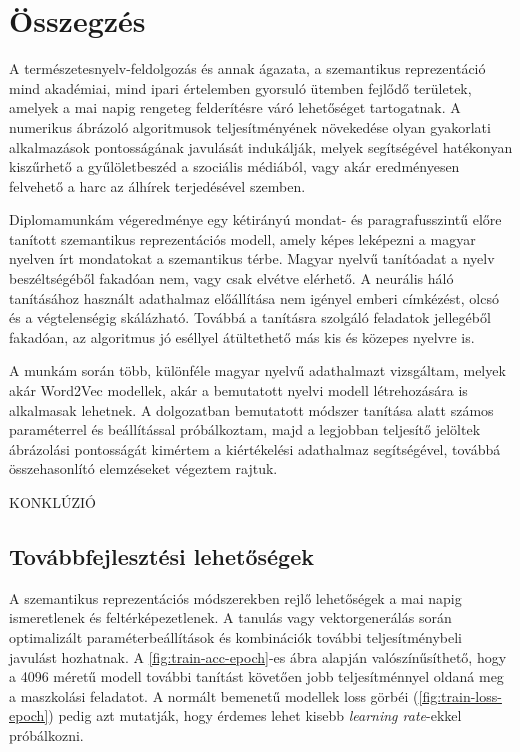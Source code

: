 \chapter{Összegzés} %
\label{ch:sum}

A természetesnyelv-feldolgozás és annak ágazata, a szemantikus reprezentáció mind akadémiai, mind ipari értelemben gyorsuló ütemben fejlődő területek, amelyek a mai napig rengeteg felderítésre váró lehetőséget tartogatnak. A numerikus ábrázoló algoritmusok teljesítményének növekedése olyan gyakorlati alkalmazások pontosságának javulását indukálják, melyek segítségével hatékonyan kiszűrhető a gyűlöletbeszéd a szociális médiából, vagy akár eredményesen felvehető a harc az álhírek terjedésével szemben. 

Diplomamunkám végeredménye egy kétirányú mondat- és paragrafusszintű előre tanított szemantikus reprezentációs modell, amely képes leképezni a magyar nyelven írt mondatokat a szemantikus térbe. Magyar nyelvű tanítóadat a nyelv beszéltségéből fakadóan nem, vagy csak elvétve elérhető. A neurális háló tanításához használt adathalmaz előállítása nem igényel emberi címkézést, olcsó és a végtelenségig skálázható. Továbbá a tanításra szolgáló feladatok jellegéből fakadóan, az algoritmus jó eséllyel átültethető más kis és közepes nyelvre is.

A munkám során több, különféle magyar nyelvű adathalmazt vizsgáltam, melyek akár Word2Vec modellek, akár a bemutatott nyelvi modell létrehozására is alkalmasak lehetnek. A dolgozatban bemutatott módszer tanítása alatt számos paraméterrel és beállítással próbálkoztam, majd a legjobban teljesítő jelöltek ábrázolási pontosságát  kimértem a kiértékelési adathalmaz segítségével, továbbá összehasonlító elemzéseket végeztem rajtuk.

KONKLÚZIÓ

\section{Továbbfejlesztési lehetőségek}
A szemantikus reprezentációs módszerekben rejlő lehetőségek a mai napig ismeretlenek és feltérképezetlenek. A tanulás vagy vektorgenerálás során optimalizált paraméterbeállítások és kombinációk további teljesítménybeli javulást hozhatnak. A \ref{fig:train-acc-epoch}-es ábra alapján valószínűsíthető, hogy a 4096 méretű modell további tanítást követően jobb teljesítménnyel oldaná meg a maszkolási feladatot. A normált bemenetű modellek loss görbéi (\ref{fig:train-loss-epoch}) pedig azt mutatják, hogy érdemes lehet kisebb \textit{learning rate}-ekkel próbálkozni.

